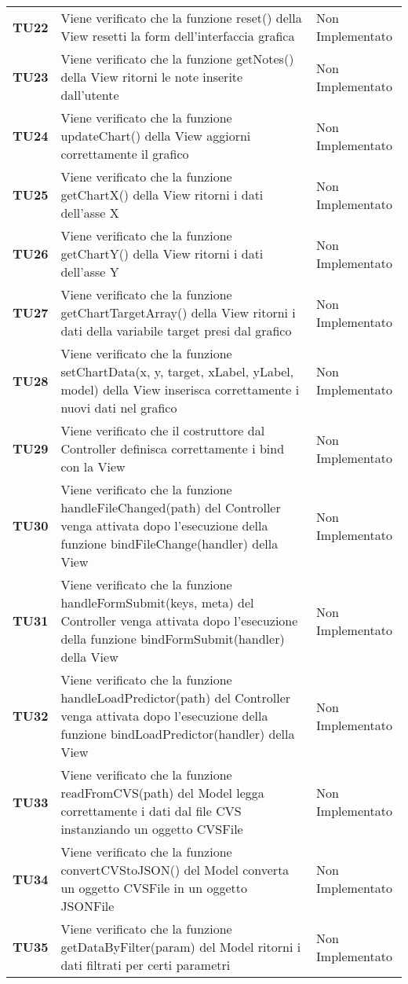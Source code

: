 \documentclass[../piano-di-qualifica.tex]{subfiles}
\begin{document}
\begin{longtable}[H]{>{\centering\bfseries}m{2.5cm} >{\centering}m{7.5cm} >{\centering\arraybackslash}m{3.5cm}}
  \textbf{TU22} & Viene verificato che la funzione reset() della View resetti la form dell'interfaccia grafica & Non Implementato \\
  \textbf{TU23} & Viene verificato che la funzione getNotes() della View ritorni le note inserite dall'utente & Non Implementato \\
  \textbf{TU24} & Viene verificato che la funzione updateChart() della View aggiorni correttamente il grafico & Non Implementato \\
  \textbf{TU25} & Viene verificato che la funzione getChartX() della View ritorni i dati dell'asse X & Non Implementato \\
  \textbf{TU26} & Viene verificato che la funzione getChartY() della View ritorni i dati dell'asse Y & Non Implementato \\
  \textbf{TU27} & Viene verificato che la funzione getChartTargetArray() della View ritorni i dati della variabile target presi dal grafico & Non Implementato \\
  \textbf{TU28} & Viene verificato che la funzione setChartData(x, y, target, xLabel, yLabel, model) della View inserisca correttamente i nuovi dati nel grafico & Non Implementato \\
  \textbf{TU29} & Viene verificato che il costruttore dal Controller definisca correttamente i bind con la View & Non Implementato \\
  \textbf{TU30} & Viene verificato che la funzione handleFileChanged(path) del Controller venga attivata dopo l'esecuzione della funzione bindFileChange(handler) della View & Non Implementato \\
  \textbf{TU31} & Viene verificato che la funzione handleFormSubmit(keys, meta) del Controller venga attivata dopo l'esecuzione della funzione bindFormSubmit(handler) della View & Non Implementato \\
  \textbf{TU32} & Viene verificato che la funzione handleLoadPredictor(path) del Controller venga attivata dopo l'esecuzione della funzione bindLoadPredictor(handler) della View & Non Implementato \\
  \textbf{TU33} & Viene verificato che la funzione readFromCVS(path) del Model legga correttamente i dati dal file CVS instanziando un oggetto CVSFile & Non Implementato \\
  \textbf{TU34} & Viene verificato che la funzione convertCVStoJSON() del Model converta un oggetto CVSFile in un oggetto JSONFile & Non Implementato \\
  \textbf{TU35} & Viene verificato che la funzione getDataByFilter(param) del Model ritorni i dati filtrati per certi parametri & Non Implementato \\

\end{longtable}
\end{document}

